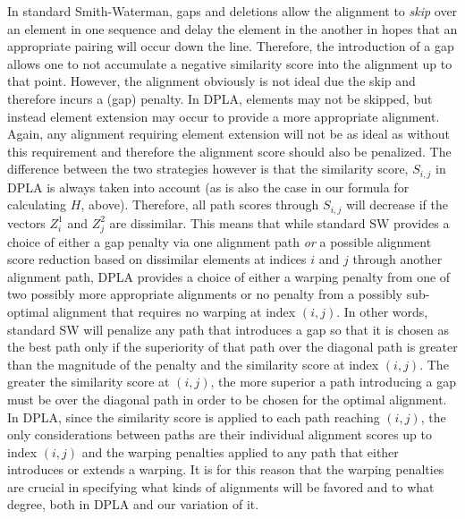 \documentclass[a4paper,12pt]{report} 	%
\numberwithin{figure}{chapter}
\numberwithin{table}{chapter}
\numberwithin{equation}{chapter}
\begin{document}
\begin{flushleft}
In standard Smith-Waterman, gaps and deletions allow the alignment to \emph{skip} over an element in one sequence and delay the element in the another in hopes that an appropriate pairing will occur down the line. Therefore, the introduction of a gap allows one to not accumulate a negative similarity score into the alignment up to that point. However, the alignment obviously is not ideal due the skip and therefore incurs a (gap) penalty. In DPLA, elements may not be skipped, but instead element extension may occur to provide a more appropriate alignment. Again, any alignment requiring element extension will not be as ideal as without this requirement and therefore the alignment score should also be penalized. The difference between the two strategies however is that the similarity score, $S_{i,j}$ in DPLA is always taken into account (as is also the case in our formula for calculating $H$, above). Therefore, all path scores through $S_{i,j}$ will decrease if the vectors $Z_i^1$ and $Z_j^2$ are dissimilar. This means that while standard SW provides a choice of either a gap penalty via one alignment path \textit{or} a possible alignment score reduction based on dissimilar elements at indices $i$ and $j$ through another alignment path, DPLA provides a choice of either a warping penalty from one of two possibly more appropriate alignments or no penalty from a possibly sub-optimal alignment that requires no warping at index $(i,j)$. In other words, standard SW will penalize any path that introduces a gap so that it is chosen as the best path only if the superiority of that path over the diagonal path is greater than the magnitude of the penalty and the similarity score at index $(i,j)$. The greater the similarity score at $(i,j)$, the more superior a path introducing a gap must be over the diagonal path in order to be chosen for the optimal alignment. In DPLA, since the similarity score is applied to each path reaching $(i,j)$, the only considerations between paths are their individual alignment scores up to index $(i,j)$ and the warping penalties applied to any path that either introduces or extends a warping. It is for this reason that the warping penalties are crucial in specifying what kinds of alignments will be favored and to what degree, both in DPLA and our variation of it.


\end{flushleft}
\end{document}
